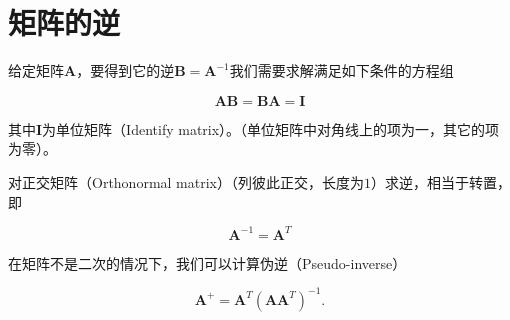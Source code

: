 
\section{矩阵的逆}

给定矩阵$\mathbf{A}$，要得到它的逆$\mathbf{B}=\mathbf{A}^{-1}$我们需要求解满足如下条件的方程组

\begin{equation}
\mathbf{AB}=\mathbf{BA}=\mathbf{I}
\end{equation}



其中$\mathbf{I}$为单位矩阵（Identify matrix）。（单位矩阵中对角线上的项为一，其它的项为零）。

对正交矩阵（Orthonormal matrix）（列彼此正交，长度为$1$）求逆，相当于转置，即

\begin{equation}
\mathbf{A}^{-1}=\mathbf{A}^T
\end{equation}


在矩阵不是二次的情况下，我们可以计算伪逆（Pseudo-inverse）

\begin{equation}
\mathbf{A}^+=\mathbf{A}^T(\mathbf{AA}^T)^{-1}.
\end{equation}
